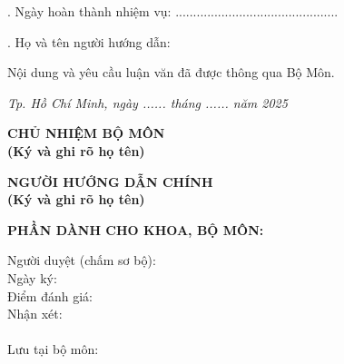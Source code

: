\vspace{0.2cm}
. Ngày hoàn thành nhiệm vụ: ..............................................

\vspace{0.2cm}
. Họ và tên người hướng dẫn: \TENCANBO

\vspace{0.4cm}
\noindent Nội dung và yêu cầu luận văn đã được thông qua Bộ Môn.

\vspace{0.3cm}
\noindent \hfill \textit{Tp. Hồ Chí Minh, ngày ...... tháng ...... năm 2025}

\vspace{0.5cm}
\begin{center}
\begin{minipage}[t]{0.48\textwidth}
\centering
\textbf{CHỦ NHIỆM BỘ MÔN} \\[1.5cm]
\textbf{\small (Ký và ghi rõ họ tên)}
\end{minipage}
\hfill
\begin{minipage}[t]{0.48\textwidth}
\centering
\textbf{NGƯỜI HƯỚNG DẪN CHÍNH} \\[1.5cm]
\textbf{\small (Ký và ghi rõ họ tên)}
\end{minipage}
\end{center}


\vspace{0.3cm}
\noindent
\textbf{PHẦN DÀNH CHO KHOA, BỘ MÔN:}

\small
\begin{minipage}[t]{0.95\textwidth} %
Người duyệt (chấm sơ bộ): \dotfill \\[0.2cm]
Ngày ký: \dotfill \\[0.2cm]
Điểm đánh giá: \dotfill \\[0.2cm]
Nhận xét: \dotfill \\[0.2cm]
\phantom{Nhận xét: } \dotfill \\[0.2cm]
Lưu tại bộ môn: \dotfill
\end{minipage}
